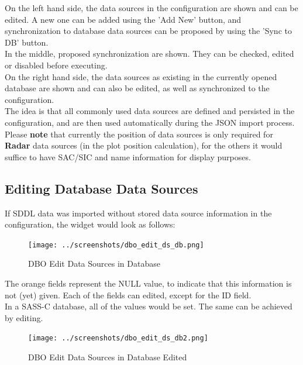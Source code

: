 {On the left hand side, the data sources in the configuration are shown and can be edited. A new one can be added using the 'Add New' button, and synchronization to database data sources can be proposed by using the 'Sync to DB' button. \\

In the middle, proposed synchronization are shown. They can be checked, edited or disabled before executing. \\

On the right hand side, the data sources as existing in the currently opened database are shown and can also be edited, as well as synchronized to the configuration. \\

The idea is that all commonly used data sources are defined and persisted in the configuration, and are then used automatically during the JSON import process. \\

Please \textbf{note} that currently the position of data sources is only required for \textbf{Radar} data sources (in the plot position calculation), for the others it would suffice to have SAC/SIC and name information for display purposes.

\subsection{Editing Database Data Sources}

If SDDL data was imported without stored data source information in the configuration, the widget would look as follows:

\begin{figure}[H]
  \hspace*{-1cm}
    \texttt{[image: ../screenshots/dbo\_edit\_ds\_db.png]}
  \caption{DBO Edit Data Sources in Database}
  \label{fig:dbo_edit_ds_db}
\end{figure}

The orange fields represent the NULL value, to indicate that this information is not (yet) given. Each of the fields can edited, except for the ID field. \\

In a SASS-C database, all of the values would be set. The same can be achieved by editing. \\

\begin{figure}[H]
  \hspace*{-2cm}
    \texttt{[image: ../screenshots/dbo\_edit\_ds\_db2.png]}
  \caption{DBO Edit Data Sources in Database Edited}
  \label{fig:dbo_edit_ds_db2}
\end{figure}

}
